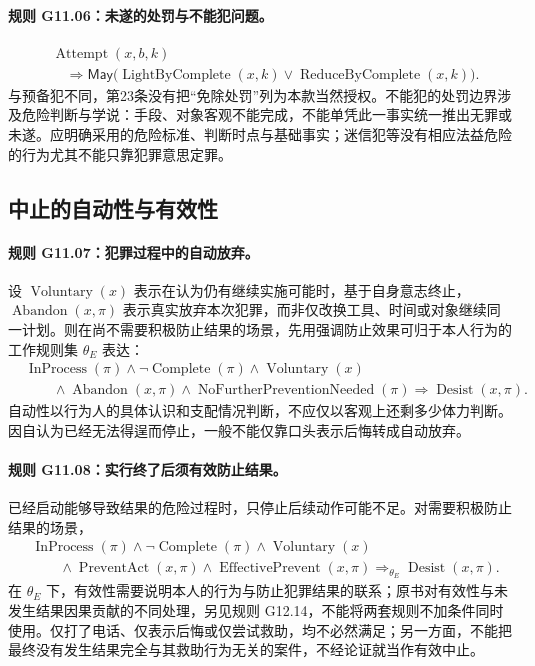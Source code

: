 \paragraph{规则 G11.06：未遂的处罚与不能犯问题。}
\[
\begin{aligned}
&\operatorname{Attempt}(x,b,k)\\
&\quad\Longrightarrow\mathsf{May}\bigl(
\operatorname{LightByComplete}(x,k)\lor\operatorname{ReduceByComplete}(x,k)\bigr).
\end{aligned}
\]
与预备犯不同，第23条没有把“免除处罚”列为本款当然授权。不能犯的处罚边界涉及危险判断与学说：手段、对象客观不能完成，不能单凭此一事实统一推出无罪或未遂。应明确采用的危险标准、判断时点与基础事实；迷信犯等没有相应法益危险的行为尤其不能只靠犯罪意思定罪。

\subsection{中止的自动性与有效性}
\paragraph{规则 G11.07：犯罪过程中的自动放弃。}
设 $\operatorname{Voluntary}(x)$ 表示在认为仍有继续实施可能时，基于自身意志终止，$\operatorname{Abandon}(x,\pi)$ 表示真实放弃本次犯罪，而非仅改换工具、时间或对象继续同一计划。则在尚不需要积极防止结果的场景，先用强调防止效果可归于本人行为的工作规则集 $\theta_E$ 表达：
\[
\begin{aligned}
&\operatorname{InProcess}(\pi)\land\neg\operatorname{Complete}(\pi)
\land\operatorname{Voluntary}(x)\\
&\qquad\land\operatorname{Abandon}(x,\pi)
\land\operatorname{NoFurtherPreventionNeeded}(\pi)
\Longrightarrow\operatorname{Desist}(x,\pi).
\end{aligned}
\]
自动性以行为人的具体认识和支配情况判断，不应仅以客观上还剩多少体力判断。因自认为已经无法得逞而停止，一般不能仅靠口头表示后悔转成自动放弃。

\paragraph{规则 G11.08：实行终了后须有效防止结果。}
已经启动能够导致结果的危险过程时，只停止后续动作可能不足。对需要积极防止结果的场景，
\[
\begin{aligned}
&\operatorname{InProcess}(\pi)\land\neg\operatorname{Complete}(\pi)
\land\operatorname{Voluntary}(x)\\
&\qquad\land\operatorname{PreventAct}(x,\pi)
\land\operatorname{EffectivePrevent}(x,\pi)
\Longrightarrow_{\theta_E}\operatorname{Desist}(x,\pi).
\end{aligned}
\]
在 $\theta_E$ 下，有效性需要说明本人的行为与防止犯罪结果的联系；原书对有效性与未发生结果因果贡献的不同处理，另见规则 G12.14，不能将两套规则不加条件同时使用。仅打了电话、仅表示后悔或仅尝试救助，均不必然满足；另一方面，不能把最终没有发生结果完全与其救助行为无关的案件，不经论证就当作有效中止。

